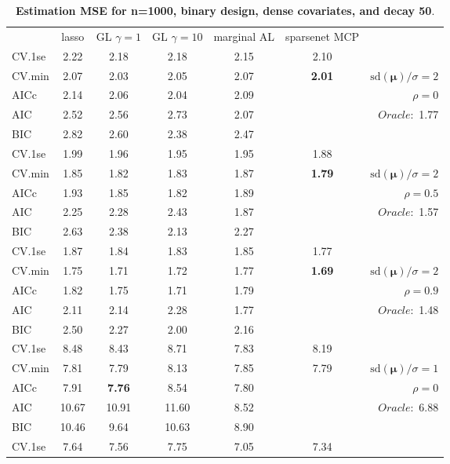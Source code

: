 \begin{table}\vspace{-.5cm}
\caption[l]{ { \bf Estimation MSE for n=1000, binary design, 
dense covariates, and  decay  50}.}
\vspace{-.5cm}
\footnotesize{}
\begin{center}
\begin{tabular}{l*{5}{c}|r}
& lasso & GL $\gamma=1$ & GL $\gamma=10$ & marginal AL & sparsenet MCP  & \\
 \cline{1-7}
CV.1se & 2.22 & 2.18 & 2.18 & 2.15 & 2.10 & \\
CV.min & 2.07 & 2.03 & 2.05 & 2.07 & {\bf 2.01} &  $\mathrm{sd}(\mathbf{\mu})/\sigma=2$ \\
AICc & 2.14 & 2.06 & 2.04 & 2.09 & & $\rho=0$ \\
AIC & 2.52 & 2.56 & 2.73 & 2.07 & &  \multirow{2}{*}{$Oracle: $ 1.77} \\
BIC & 2.82 & 2.60 & 2.38 & 2.47 & &  \\
 \hline 
CV.1se & 1.99 & 1.96 & 1.95 & 1.95 & 1.88 & \\
CV.min & 1.85 & 1.82 & 1.83 & 1.87 & {\bf 1.79} &  $\mathrm{sd}(\mathbf{\mu})/\sigma=2$ \\
AICc & 1.93 & 1.85 & 1.82 & 1.89 & & $\rho=0.5$ \\
AIC & 2.25 & 2.28 & 2.43 & 1.87 & &  \multirow{2}{*}{$Oracle: $ 1.57} \\
BIC & 2.63 & 2.38 & 2.13 & 2.27 & &  \\
 \hline 
CV.1se & 1.87 & 1.84 & 1.83 & 1.85 & 1.77 & \\
CV.min & 1.75 & 1.71 & 1.72 & 1.77 & {\bf 1.69} &  $\mathrm{sd}(\mathbf{\mu})/\sigma=2$ \\
AICc & 1.82 & 1.75 & 1.71 & 1.79 & & $\rho=0.9$ \\
AIC & 2.11 & 2.14 & 2.28 & 1.77 & &  \multirow{2}{*}{$Oracle: $ 1.48} \\
BIC & 2.50 & 2.27 & 2.00 & 2.16 & &  \\
 \hline 
CV.1se & 8.48 & 8.43 & 8.71 & 7.83 & 8.19 & \\
CV.min & 7.81 & 7.79 & 8.13 & 7.85 & 7.79 &  $\mathrm{sd}(\mathbf{\mu})/\sigma=1$ \\
AICc & 7.91 & {\bf 7.76} & 8.54 & 7.80 & & $\rho=0$ \\
AIC & 10.67 & 10.91 & 11.60 & 8.52 & &  \multirow{2}{*}{$Oracle: $ 6.88} \\
BIC & 10.46 & 9.64 & 10.63 & 8.90 & &  \\
 \hline 
CV.1se & 7.64 & 7.56 & 7.75 & 7.05 & 7.34 & \\

\end{tabular}
\end{center}
\end{table}
